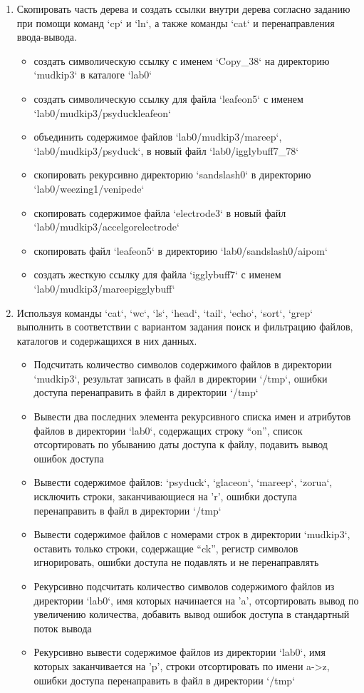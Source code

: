 \begin{enumerate}
        \item Скопировать часть дерева и создать ссылки внутри дерева согласно заданию при помощи команд `cp` и `ln`, а также команды `cat` и перенаправления ввода-вывода.
        \begin{itemize}
            \item создать символическую ссылку с именем `Copy\_38` на директорию `mudkip3` в каталоге `lab0`
            \item создать символическую ссылку для файла `leafeon5` с именем `lab0/mudkip3/psyduckleafeon`
            \item объединить содержимое файлов `lab0/mudkip3/mareep`, `lab0/mudkip3/psyduck`, в новый файл `lab0/igglybuff7\_78`
            \item скопировать рекурсивно директорию `sandslash0` в директорию `lab0/weezing1/venipede`
            \item скопировать содержимое файла `electrode3` в новый файл `lab0/mudkip3/accelgorelectrode`
            \item скопировать файл `leafeon5` в директорию `lab0/sandslash0/aipom`
            \item создать жесткую ссылку для файла `igglybuff7` с именем `lab0/mudkip3/mareepigglybuff`
        \end{itemize}

        \item Используя команды `cat`, `wc`, `ls`, `head`, `tail`, `echo`, `sort`, `grep` выполнить в соответствии с вариантом задания поиск и фильтрацию файлов, каталогов и содержащихся в них данных.
        \begin{itemize}
            \item Подсчитать количество символов содержимого файлов в директории `mudkip3`, результат записать в файл в директории `/tmp`, ошибки доступа перенаправить в файл в директории `/tmp`
            \item Вывести два последних элемента рекурсивного списка имен и атрибутов файлов в директории `lab0`, содержащих строку ``on'', список отсортировать по убыванию даты доступа к файлу, подавить вывод ошибок доступа
            \item Вывести содержимое файлов: `psyduck`, `glaceon`, `mareep`, `zorua`, исключить строки, заканчивающиеся на 'r', ошибки доступа перенаправить в файл в директории `/tmp`
            \item Вывести содержимое файлов с номерами строк в директории `mudkip3`, оставить только строки, содержащие ``ck'', регистр символов игнорировать, ошибки доступа не подавлять и не перенаправлять
            \item Рекурсивно подсчитать количество символов содержимого файлов из директории `lab0`, имя которых начинается на 'a', отсортировать вывод по увеличению количества, добавить вывод ошибок доступа в стандартный поток вывода
            \item Рекурсивно вывести содержимое файлов из директории `lab0`, имя которых заканчивается на 'p', строки отсортировать по имени a->z, ошибки доступа перенаправить в файл в директории `/tmp`
        \end{itemize}


\end{enumerate}
